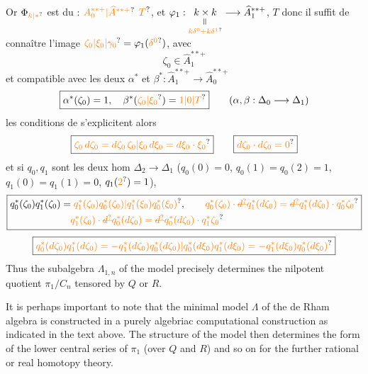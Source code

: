 Or $\Phi_{\unsure{k|*}}$ est    du  :  $\unsure{A_0^{**+}|\widehat A^{**+}}$   $\unsure{T}$, et $\varphi_1:\underset{\unsure{k\delta^0+k\delta^1}}{\underset{\rotatebox{90}{$=$}}{k\times k}}\longrightarrow\widehat A_1^{**+}$,    $T$ donc il suffit de connaître l'image
$\unsure{\zeta_0|\xi_0|\gamma_0}=\varphi_1(\unsure{\delta^0})$, avec
\[
 \zeta_0\in\widehat A_1^{**+}
\]
et compatible avec les deux  $\alpha^*$ et $\beta^*:\widehat A_1^{**+}\longrightarrow\widehat A_0^{**+}$
\[
 \boxed{\alpha^*(\zeta_0)=1,\quad\beta^*(\unsure{\zeta_0|\xi_0})=\unsure{1|0|T}}\qquad
 (\alpha,\beta:\Delta_0\longrightarrow\Delta_1)
\]
les conditions de    s'explicitent alors 
\[
 \boxed{\unsure{\zeta_0\,d\zeta_0=d\zeta_0\,\zeta_0|\xi_0\,d\xi_0=d\xi_0\cdot\xi_0}}\qquad \boxed{\unsure{d\zeta_0\cdot d\zeta_0=0}}
\]
et si $q_0,q_1$ sont les deux hom  $\Delta_2\longrightarrow\Delta_1$ ($q_0(0)=0$, $q_0(1)=q_0(2)=1$, $q_1(0)=q_1(1)=0$, $q_1(\unsure{2})=1$), 
\[
 \boxed{\begin{aligned}
 q_0^*(\zeta_0)q_1^*(\zeta_0)&=\unsure{q_1^*(\zeta_0)q_0^*(\zeta_0)|q_1^*(\xi_0)q_0^*(\xi_0)},\qquad
 \unsure{q_0^*(\zeta_0)\cdot\deleted{\unsure{d}}q_1^*(d\zeta_0)=\deleted{\unsure{d}}q_1^*(d\zeta_0)\cdot q_0^*\zeta_0}\\
 &\hspace{1em}\unsure{q_1^*(\zeta_0)\cdot\deleted{\unsure{d}}q_0^*(d\zeta_0)=\deleted{\unsure{d}}q_0^*(d\zeta_0)\cdot q_1^*\zeta_0}
 \end{aligned}}
\]
\[
 \boxed{\unsure{q_0^*(d\zeta_0)q_1^*(d\zeta_0)=-q_1^*(d\zeta_0)q_0^*(d\zeta_0)|q_0^*(d\xi_0)q_1^*(d\xi_0)=-q_1^*(d\xi_0)q_0^*(d\xi_0)}}
\]
Thus the subalgebra $\Lambda_{1,n}$ of the model precisely determines the nilpotent quotient $\pi_1/C_n$ tensored by $Q$ or $R$.

It is perhaps important to note that the minimal model $\Lambda$ of the de Rham algebra is constructed in a purely algebriac computational construction as indicated in the text above. The structure of the model then determines the form of the lower central series of $\pi_1$ (over $Q$ and $R$) and so on for\unsure{:} the further rational or real homotopy theory.


